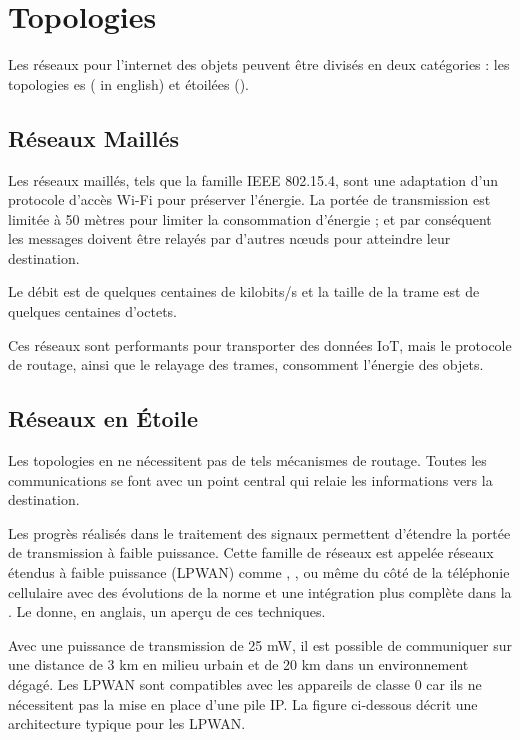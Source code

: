 \section{Topologies}

Les réseaux pour l’internet des objets peuvent être divisés en deux catégories : les topologies es ( in english) et étoilées ().


\subsection*{Réseaux Maillés}

Les réseaux maillés, tels que la famille IEEE 802.15.4,  sont une adaptation d’un protocole d’accès Wi-Fi pour préserver l’énergie. La portée de transmission est limitée à 50 mètres pour limiter la consommation d'énergie ; et par conséquent les messages doivent être relayés par d’autres nœuds pour atteindre leur destination.

Le débit est de quelques centaines de kilobits/s et la taille de la trame est de quelques centaines d’octets. 

Ces réseaux sont performants pour transporter des données IoT, mais le protocole de routage, ainsi que le relayage des trames, consomment l’énergie des objets.

\subsection*{Réseaux en Étoile}

Les topologies en  ne nécessitent pas de tels mécanismes de routage. Toutes les communications se font avec un point central qui relaie les informations vers la destination.

Les progrès réalisés dans le traitement des signaux permettent d’étendre la portée de transmission à faible puissance. Cette famille de réseaux est appelée réseaux étendus à faible puissance (\ac{LPWAN}) comme , , ou même du côté de la téléphonie cellulaire avec des évolutions de la norme  et une intégration plus complète dans la . Le  donne, en anglais, un aperçu de ces techniques.


    \vspace{1em}

Avec une puissance de transmission de 25 mW, il est possible de communiquer sur une distance de 3 km en milieu urbain et de 20 km dans un environnement dégagé. Les \ac{LPWAN} sont compatibles avec les appareils de classe 0 car ils ne nécessitent pas la mise en place d’une pile \ac{IP}. La figure ci-dessous décrit une architecture typique pour les \ac{LPWAN}.

